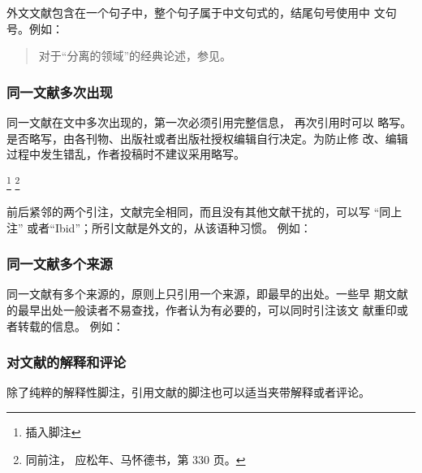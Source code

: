 \documentclass{article}
\begin{document}
外文文献包含在一个句子中，整个句子属于中文句式的，结尾句号使用中
文句号。例如：
\begin{quotation}
对于“分离的领域”的经典论述，参见。
\end{quotation}


\subsubsection{同一文献多次出现}

同一文献在文中多次出现的，第一次必须引用完整信息， 再次引用时可以
略写。 是否略写，由各刊物、出版社或者出版社授权编辑自行决定。为防止修
改、编辑过程中发生错乱，作者投稿时不建议采用略写。

\footnote{插入脚注}
\footnote{同前注， 应松年、马怀德书，第 330 页。}

前后紧邻的两个引注，文献完全相同，而且没有其他文献干扰的，可以写
“同上注” 或者“Ibid”；所引文献是外文的，从该语种习惯。 
例如：



\subsubsection{同一文献多个来源}

同一文献有多个来源的，原则上只引用一个来源，即最早的出处。一些早
期文献的最早出处一般读者不易查找，作者认为有必要的，可以同时引注该文
献重印或者转载的信息。
例如：

\begin{quotation}


\end{quotation}


\subsubsection{对文献的解释和评论}
除了纯粹的解释性脚注，引用文献的脚注也可以适当夹带解释或者评论。
\end{document}
